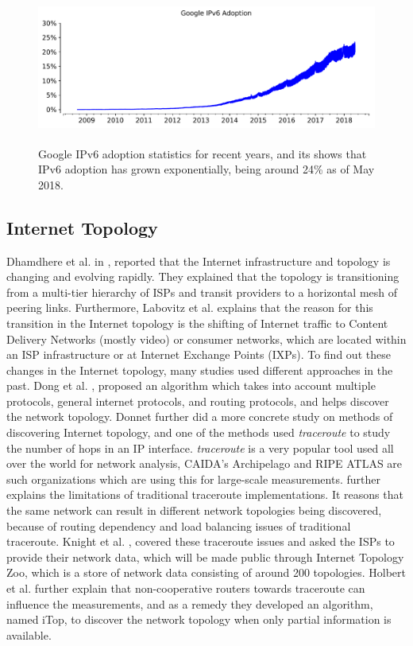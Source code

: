\begin{figure}[!ht]
	\centering
	\includegraphics[keepaspectratio, height=5cm, width=15cm]{figures/googlev6stats.pdf}
	\caption[Google IPv6 Adoption Statistics]{Google IPv6 adoption statistics \cite{gv6} for recent years, and its shows that IPv6 adoption has grown exponentially, being around 24\% as of May 2018.}
	\label{fig:Google IPv6 Adoption Statistics}
\end{figure}

\subsection*{Internet Topology}

Dhamdhere et al. in \cite{dhamdhereflat}, reported that the Internet infrastructure and topology is changing and evolving rapidly. They explained that the topology is transitioning from a multi-tier hierarchy of ISPs and transit providers to a horizontal mesh of peering links. Furthermore, Labovitz et al. \cite{topologycraig} explains that the reason for this transition in the Internet topology is the shifting 
of Internet traffic to Content Delivery Networks (mostly video) or consumer networks, which are located within an ISP infrastructure or at Internet Exchange Points (IXPs).
To find out these changes in the Internet topology, many studies used different approaches in the past. Dong et al. \cite{topologydong}, proposed an algorithm which takes
into account multiple protocols, general internet protocols, and routing protocols, and helps discover the network topology. Donnet \cite{topologybenoit} further did a more concrete study on methods of discovering Internet topology, and one of the methods used \textit{traceroute} to study the number of hops in an IP interface. \textit{traceroute} is a very popular
tool used all over the world for network analysis, CAIDA’s Archipelago \cite{caidaark} and RIPE ATLAS \cite{ripeatlas} are such organizations which are using this for large-scale measurements.
\cite{topologybenoit} further explains the limitations of traditional traceroute implementations. It reasons that the same network can result in different network topologies being discovered,
because of routing dependency and load balancing issues of traditional traceroute. Knight et al. \cite{topologysimon}, covered these traceroute issues and asked the ISPs to provide their
network data, which will be made public through Internet Topology Zoo, which is a store of network data consisting of around 200 topologies. Holbert et al. \cite{topologybrett} further
explain that non-cooperative routers towards traceroute can influence the measurements, and as a remedy they developed an algorithm, named iTop, to discover the network topology
when only partial information is available. 

